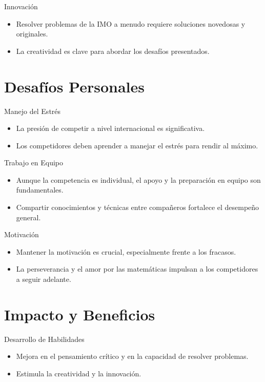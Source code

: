 \documentclass{beamer}
\begin{document}
\begin{frame}{Innovación}
    \begin{itemize}
        \item Resolver problemas de la IMO a menudo requiere soluciones novedosas y originales.
        \item La creatividad es clave para abordar los desafíos presentados.
    \end{itemize}
\end{frame}

\section{Desafíos Personales}
\begin{frame}{Manejo del Estrés}
    \begin{itemize}
        \item La presión de competir a nivel internacional es significativa.
        \item Los competidores deben aprender a manejar el estrés para rendir al máximo.
    \end{itemize}
\end{frame}

\begin{frame}{Trabajo en Equipo}
    \begin{itemize}
        \item Aunque la competencia es individual, el apoyo y la preparación en equipo son fundamentales.
        \item Compartir conocimientos y técnicas entre compañeros fortalece el desempeño general.
    \end{itemize}
\end{frame}

\begin{frame}{Motivación}
    \begin{itemize}
        \item Mantener la motivación es crucial, especialmente frente a los fracasos.
        \item La perseverancia y el amor por las matemáticas impulsan a los competidores a seguir adelante.
    \end{itemize}
\end{frame}

\section{Impacto y Beneficios}
\begin{frame}{Desarrollo de Habilidades}
    \begin{itemize}
        \item Mejora en el pensamiento crítico y en la capacidad de resolver problemas.
        \item Estimula la creatividad y la innovación.
    \end{itemize}
\end{frame}
\end{document}
